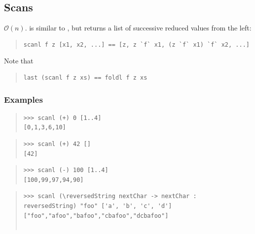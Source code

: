 \subsection{Scans}
\begin{haddockdesc}
\item[\begin{tabular}{@{}l}
scanl :: (b -> a -> b) -> b -> {\char 91}a{\char 93} -> {\char 91}b{\char 93}
\end{tabular}]
{\haddockbegindoc
\(\mathcal{O}(n)\).  is similar to , but returns a list of
 successive reduced values from the left:\par
\begin{quote}
{\haddockverb\begin{verbatim}
scanl f z [x1, x2, ...] == [z, z `f` x1, (z `f` x1) `f` x2, ...]\end{verbatim}}
\end{quote}
Note that\par
\begin{quote}
{\haddockverb\begin{verbatim}
last (scanl f z xs) == foldl f z xs\end{verbatim}}
\end{quote}
\subsubsection*{\textbf{Examples}}
\begin{quote}
{\haddockverb\begin{verbatim}
>>> scanl (+) 0 [1..4]
[0,1,3,6,10]

\end{verbatim}}
\end{quote}
\begin{quote}
{\haddockverb\begin{verbatim}
>>> scanl (+) 42 []
[42]

\end{verbatim}}
\end{quote}
\begin{quote}
{\haddockverb\begin{verbatim}
>>> scanl (-) 100 [1..4]
[100,99,97,94,90]

\end{verbatim}}
\end{quote}
\begin{quote}
{\haddockverb\begin{verbatim}
>>> scanl (\reversedString nextChar -> nextChar : reversedString) "foo" ['a', 'b', 'c', 'd']
["foo","afoo","bafoo","cbafoo","dcbafoo"]


\end{verbatim}}
\end{quote}}
\end{haddockdesc}
